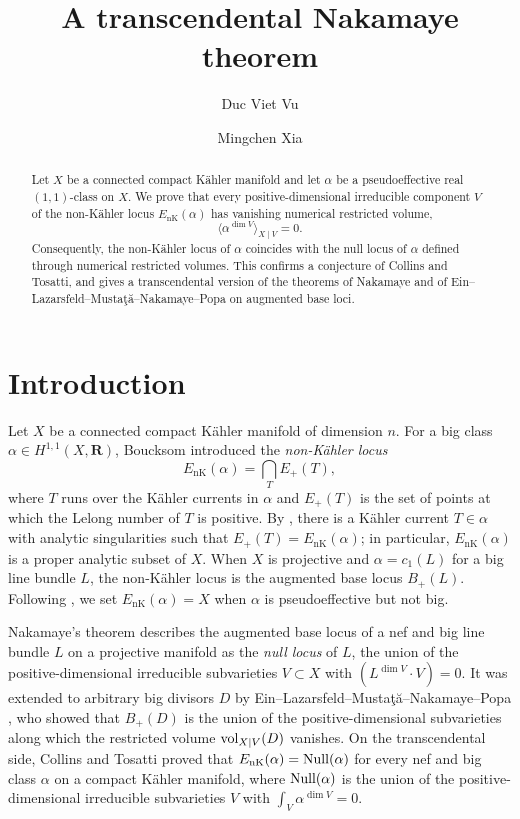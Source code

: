 \documentclass[11pt,a4paper]{amsart}
\title{A transcendental Nakamaye theorem}
\author{Duc Viet Vu \and Mingchen Xia}
\date{}
\newcommand{\EnK}{E_{\mathrm{nK}}}
\theoremstyle{definition}
\begin{document}
\begin{abstract}
Let $X$ be a connected compact K\"ahler manifold and let $\alpha$ be a
pseudoeffective real $(1,1)$-class on $X$. We prove that every
positive-dimensional irreducible component $V$ of the non-K\"ahler locus
$\EnK(\alpha)$ has vanishing numerical restricted volume,
\[
  \langle\alpha^{\dim V}\rangle_{X\mid V}=0.
\]
Consequently, the non-K\"ahler locus of $\alpha$ coincides with the null
locus of $\alpha$ defined through numerical restricted volumes. This
confirms a conjecture of Collins and Tosatti, and gives a transcendental
version of the theorems of Nakamaye and of
Ein--Lazarsfeld--Musta\c{t}\u{a}--Nakamaye--Popa on augmented base loci.
\end{abstract}
\maketitle


\section{Introduction}

Let $X$ be a connected compact K\"ahler manifold of dimension $n$. For a big
class $\alpha\in H^{1,1}(X,\mathbf R)$, Boucksom \cite{Bou04} introduced
the \emph{non-K\"ahler locus}
\[
  \EnK(\alpha)=\bigcap_{T}E_+(T),
\]
where $T$ runs over the K\"ahler currents in $\alpha$ and $E_+(T)$
is the set of points at which the Lelong number of $T$ is positive.
By \cite[Theorem~3.17]{Bou04}, there is a K\"ahler current
$T\in\alpha$ with analytic singularities such that
$E_+(T)=\EnK(\alpha)$; in particular, $\EnK(\alpha)$ is a proper analytic
subset of $X$. When $X$ is projective and $\alpha=c_1(L)$ for a big
line bundle $L$, the non-K\"ahler locus is the augmented base
locus $B_+(L)$. Following \cite{CT22}, we set $\EnK(\alpha)=X$
when $\alpha$ is pseudoeffective but not big.

Nakamaye's theorem \cite{Nak00} describes the augmented base locus of a nef
and big line bundle $L$ on a projective manifold as the \emph{null locus}
of $L$, the union of the positive-dimensional irreducible
subvarieties $V\subset X$ with $(L^{\dim V}\cdot V)=0$. It was extended
to arbitrary big divisors $D$ by
Ein--Lazarsfeld--Musta\c{t}\u{a}--Nakamaye--Popa \cite{ELMNP09}, who showed
that $B_+(D)$ is the union of the positive-dimensional subvarieties along
which the restricted volume $\operatorname{vol}_{X\mid V}(D)$ vanishes. On the
transcendental side, Collins and Tosatti \cite{CT15} proved that
$\EnK(\alpha)=\Null(\alpha)$ for every nef and big class $\alpha$ on a
compact K\"ahler manifold, where
$\operatorname{Null}(\alpha)$ is the union of the positive-dimensional irreducible
subvarieties $V$ with $\int_V\alpha^{\dim V}=0$.
\end{document}
